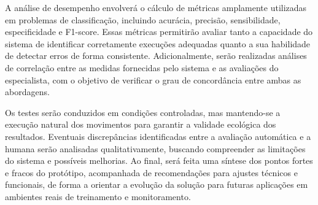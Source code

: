 A análise de desempenho envolverá o cálculo de métricas amplamente utilizadas em problemas de classificação, incluindo acurácia, precisão, sensibilidade, especificidade e F1-score. Essas métricas permitirão avaliar tanto a capacidade do sistema de identificar corretamente execuções adequadas quanto a sua habilidade de detectar erros de forma consistente. Adicionalmente, serão realizadas análises de correlação entre as medidas fornecidas pelo sistema e as avaliações do especialista, com o objetivo de verificar o grau de concordância entre ambas as abordagens.

Os testes serão conduzidos em condições controladas, mas mantendo-se a execução natural dos movimentos para garantir a validade ecológica dos resultados. Eventuais discrepâncias identificadas entre a avaliação automática e a humana serão analisadas qualitativamente, buscando compreender as limitações do sistema e possíveis melhorias. Ao final, será feita uma síntese dos pontos fortes e fracos do protótipo, acompanhada de recomendações para ajustes técnicos e funcionais, de forma a orientar a evolução da solução para futuras aplicações em ambientes reais de treinamento e monitoramento.